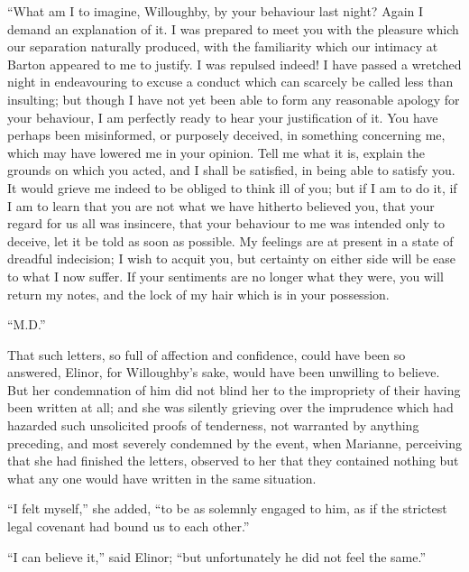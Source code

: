 \bigskip
     ``What am I to imagine, Willoughby, by your
     behaviour last night?  Again I demand an explanation
     of it.  I was prepared to meet you with the pleasure
     which our separation naturally produced, with the
     familiarity which our intimacy at Barton appeared
     to me to justify.  I was repulsed indeed! I have
     passed a wretched night in endeavouring to excuse
     a conduct which can scarcely be called less than
     insulting; but though I have not yet been able to
     form any reasonable apology for your behaviour,
     I am perfectly ready to hear your justification of
     it.  You have perhaps been misinformed, or purposely
     deceived, in something concerning me, which may have
     lowered me in your opinion.  Tell me what it is,
     explain the grounds on which you acted, and I shall
     be satisfied, in being able to satisfy you.  It
     would grieve me indeed to be obliged to think ill
     of you; but if I am to do it, if I am to learn that
     you are not what we have hitherto believed you, that
     your regard for us all was insincere, that your
     behaviour to me was intended only to deceive, let
     it be told as soon as possible.  My feelings are at
     present in a state of dreadful indecision; I wish
     to acquit you, but certainty on either side will be
     ease to what I now suffer.  If your sentiments are
     no longer what they were, you will return my notes,
     and the lock of my hair which is in your possession.

\medskip
                                             ``M.D.''
\bigskip

That such letters, so full of affection and confidence,
could have been so answered, Elinor, for Willoughby's sake,
would have been unwilling to believe.  But her condemnation
of him did not blind her to the impropriety of their
having been written at all; and she was silently grieving
over the imprudence which had hazarded such unsolicited
proofs of tenderness, not warranted by anything preceding,
and most severely condemned by the event, when Marianne,
perceiving that she had finished the letters, observed to
her that they contained nothing but what any one would
have written in the same situation.

``I felt myself,'' she added, ``to be as solemnly
engaged to him, as if the strictest legal covenant
had bound us to each other.''

``I can believe it,'' said Elinor; ``but unfortunately
he did not feel the same.''

